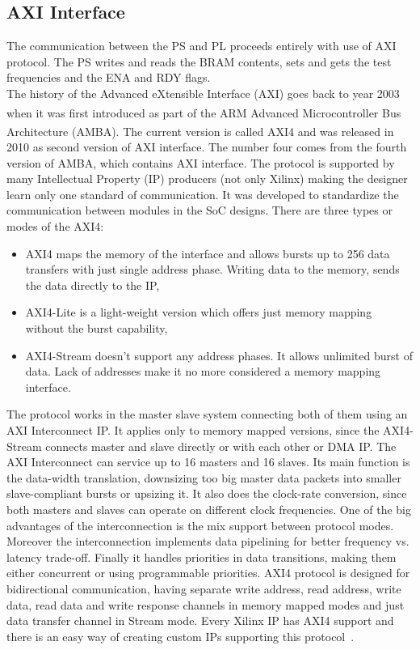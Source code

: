 \subsection{AXI Interface}
The communication between the PS and PL proceeds entirely with use of AXI protocol. The PS writes and reads the BRAM contents, sets and gets the test frequencies and the ENA and RDY flags.\\
The history of the Advanced eXtensible Interface (AXI) goes back to year 2003 when it was first introduced as part of the ARM\textsuperscript{\textregistered} Advanced Microcontroller Bus Architecture (AMBA\textsuperscript{\textregistered}). The current version is called AXI4 and was released in 2010 as second version of AXI interface. The number four comes from the fourth version of AMBA, which contains AXI interface. The protocol is supported by many Intellectual Property (IP) producers (not only Xilinx) making the designer learn only one standard of communication. It was developed to standardize the communication between modules in the SoC designs. There are three types or modes of the AXI4:
\begin{itemize}
    \item AXI4 maps the memory of the interface and allows bursts up to 256 data transfers with just single address phase. Writing data to the memory, sends the data directly to the IP,
    \item AXI4-Lite is a light-weight version which offers just memory mapping without the burst capability,
    \item AXI4-Stream doesn't support any address phases. It allows unlimited burst of data. Lack of addresses make it no more considered a memory mapping interface.
\end{itemize}
The protocol works in the master slave system connecting both of them using an AXI Interconnect IP. It applies only to memory mapped versions, since the AXI4-Stream connects master and slave directly or with each other or DMA IP. The AXI Interconnect can service up to 16 masters and 16 slaves. Its main function is the data-width translation, downsizing too big master data packets into smaller slave-compliant bursts or upsizing it. It also does the clock-rate conversion, since both masters and slaves can operate on different clock frequencies. One of the big advantages of the interconnection is the mix support between protocol modes. Moreover the interconnection implements data pipelining for better frequency vs. latency trade-off. Finally it handles priorities in data transitions, making them either concurrent or using programmable priorities.
AXI4 protocol is designed for bidirectional communication, having separate write address, read address, write data, read data and write response channels in memory mapped modes and just data transfer channel in Stream mode. Every Xilinx IP has AXI4 support and there is an easy way of creating custom IPs supporting this protocol~\cite{report:AXI}.

